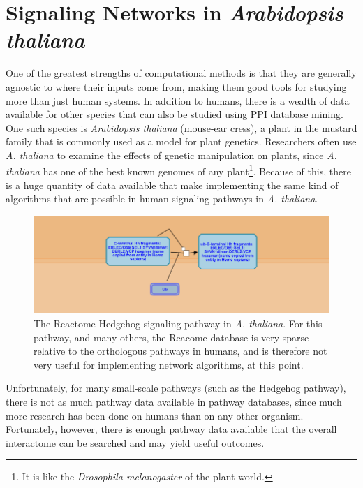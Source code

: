 \documentclass[12pt,twoside]{reedthesis}
\theoremstyle{definition}
\begin{document}
\section{Signaling Networks in \emph{Arabidopsis thaliana}}

One of the greatest strengths of computational methods is that they are generally agnostic to where their inputs come from, making them good tools for studying more than just human systems. In addition to humans, there is a wealth of data available for other species that can also be studied using PPI database mining. One such species is \textit{Arabidopsis thaliana} (mouse-ear cress), a plant in the mustard family that is commonly used as a model for plant genetics. Researchers often use \textit{A. thaliana} to examine the effects of genetic manipulation on plants, since \textit{A. thaliana} has one of the best known genomes of any plant\footnote{It is like the \textit{Drosophila melanogaster} of the plant world.}. Because of this, there is a huge quantity of data available that make implementing the same kind of algorithms that are possible in human signaling pathways in \textit{A. thaliana}.

\begin{figure}[h]
  \begin{center}
    \includegraphics[width=\textwidth]{at_hh}
  \caption[\textit{Arabidopsis thaliana} Hedgehog pathway]{The Reactome Hedgehog signaling pathway in \textit{A. thaliana}. For this pathway, and many others, the Reacome database is very sparse relative to the orthologous pathways in humans, and is therefore not very useful for implementing network algorithms, at this point.}
  \label{fig:at_hh}
  \end{center}
\end{figure}

Unfortunately, for many small-scale pathways (such as the Hedgehog pathway), there is not as much pathway data available in pathway databases, since much more research has been done on humans than on any other organism. Fortunately, however, there is enough pathway data available that the overall interactome can be searched and may yield useful outcomes.\par
\end{document}

